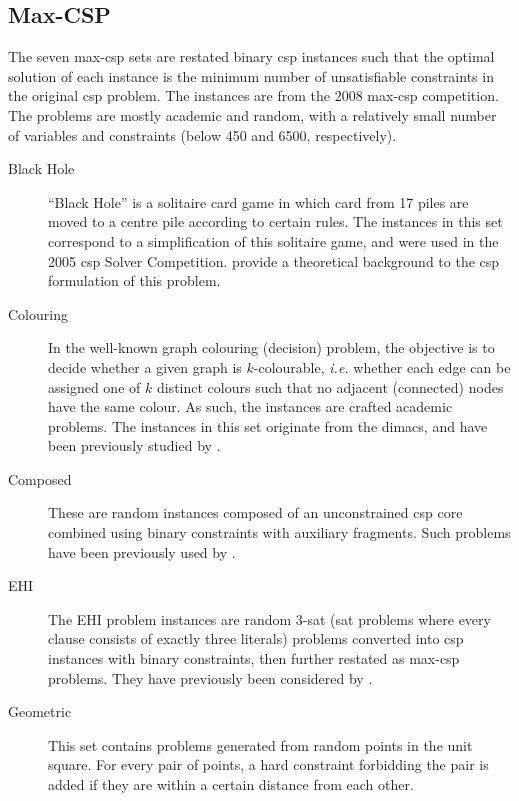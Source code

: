 \subsection{Max-CSP}
The seven max-\gls{csp} sets are restated binary \gls{csp} instances such that the optimal solution of each instance is the minimum number of unsatisfiable constraints in the original \gls{csp} problem.
The instances are from the 2008 max-\gls{csp} competition.
The problems are mostly academic and random, with a relatively small number of variables and constraints (below \num{450} and \num{6500}, respectively).

\begin{description}
	\item[Black Hole]
		\enquote{Black Hole} is a solitaire card game in which card from 17 piles are moved to a centre pile according to certain rules.
		The instances in this set correspond to a simplification of this solitaire game, and were used in the 2005 \gls{csp} Solver Competition.
		\Textcite{Gent07} provide a theoretical background to the \gls{csp} formulation of this problem.
	\item[Colouring]
		In the well-known graph colouring (decision) problem, the objective is to decide whether a given graph is \(k\)-colourable, \emph{i.e.} whether each edge can be assigned one of \(k\) distinct colours such that no adjacent (connected) nodes have the same colour.
		As such, the instances are crafted academic problems.
		The instances in this set originate from the \gls{dimacs}, and have been previously studied by \textcite{Benhamou07}.
	\item[Composed]
		These are random instances composed of an unconstrained \gls{csp} core combined using binary constraints with auxiliary fragments.
		Such problems have been previously used by \textcite{Lecoutre04,Jussien00}.
	\item[EHI]
		The EHI problem instances are random 3-\gls{sat} (\gls{sat} problems where every clause consists of exactly three literals) problems converted into \gls{csp} instances with binary constraints, then further restated as max-\gls{csp} problems. They have previously been considered by \textcite{Lecoutre04}.
	\item[Geometric]
		This set contains problems generated from random points in the unit square. For every pair of points, a hard constraint forbidding the pair is added if they are within a certain distance from each other.

\end{description}
